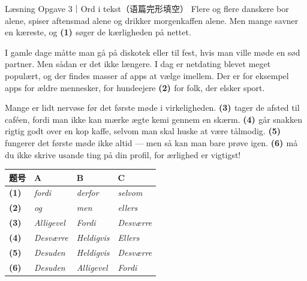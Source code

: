 \vspace{0.3em}
\begin{emailbox}{Læsning Opgave 3｜Ord i tekst（语篇完形填空）}
Flere og flere danskere bor alene, spiser aftensmad alene og drikker morgenkaffen alene. Men mange savner en kæreste, og \textbf{(1) \underline{\hspace{1.6cm}}} søger de kærligheden på nettet.

I gamle dage måtte man gå på diskotek eller til fest, hvis man ville møde en sød partner. Men sådan er det ikke længere. I dag er netdating blevet meget populært, og der findes masser af apps at vælge imellem. Der er for eksempel apps for ældre mennesker, for hundeejere \textbf{(2) \underline{\hspace{1.6cm}}} for folk, der elsker sport.

Mange er lidt nervøse før det første møde i virkeligheden. \textbf{(3) \underline{\hspace{1.6cm}}} tager de afsted til caféen, fordi man ikke kan mærke ægte kemi gennem en skærm. \textbf{(4) \underline{\hspace{1.6cm}}} går snakken rigtig godt over en kop kaffe, selvom man skal huske at være tålmodig. \textbf{(5) \underline{\hspace{1.6cm}}} fungerer det første møde ikke altid --- men så kan man bare prøve igen. \textbf{(6) \underline{\hspace{1.6cm}}} må du ikke skrive usande ting på din profil, for ærlighed er vigtigst!
\end{emailbox}

\vspace{0.3em}
{\small
\renewcommand{\arraystretch}{1.22}
\begin{tabularx}{\linewidth}{@{} l X X X @{}}
\toprule
\textbf{题号} & \textbf{A} & \textbf{B} & \textbf{C} \\
\midrule
\textbf{(1)} & \textit{fordi} & \textit{derfor} & \textit{selvom} \\
\textbf{(2)} & \textit{og} & \textit{men} & \textit{ellers} \\
\textbf{(3)} & \textit{Alligevel} & \textit{Fordi} & \textit{Desværre} \\
\textbf{(4)} & \textit{Desværre} & \textit{Heldigvis} & \textit{Ellers} \\
\textbf{(5)} & \textit{Desuden} & \textit{Heldigvis} & \textit{Desværre} \\
\textbf{(6)} & \textit{Desuden} & \textit{Alligevel} & \textit{Fordi} \\
\bottomrule
\end{tabularx}
}

